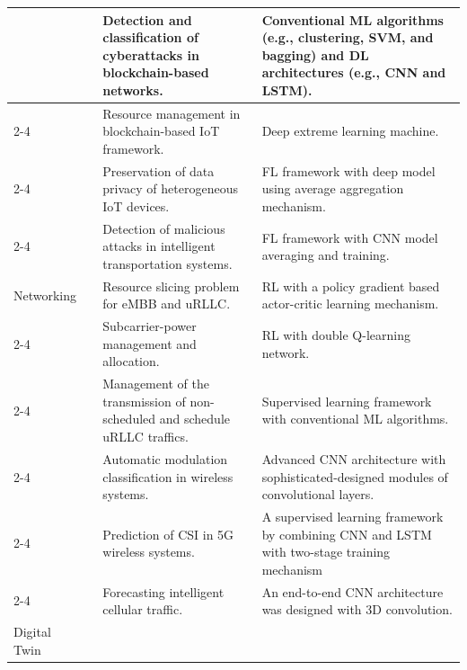 \documentclass[journal]{IEEEtran}
\begin{document}
\begin{table}[ht!]
\begin{tabular}{|p{2.10cm}|p{0.75cm}|p{5.75cm}|p{7.85cm}|}
& \cite{tanwar2019machine}	& Detection and classification of cyberattacks in blockchain-based networks.	& Conventional ML algorithms (e.g., clustering, SVM, and bagging) and DL architectures (e.g., CNN and LSTM). \\  \cline{2-4}
& \cite{khan2021amachine}	& Resource management in blockchain-based IoT framework.	& Deep extreme learning machine.\\  \cline{2-4}
& \cite{fan2021hybrid}	& Preservation of data privacy of heterogeneous IoT devices.	& FL framework with deep model using average aggregation mechanism. \\  \cline{2-4}
& \cite{liu2021blockchain}	& Detection of malicious attacks in intelligent transportation systems.	& FL framework with CNN model averaging and training.
 \\  \hline\hline
  
Networking 
& \cite{she2020deeplearning}	& Resource slicing problem for eMBB and uRLLC.	& RL with a policy gradient based actor-critic learning mechanism.\\  \cline{2-4}
& \cite{gu2021deepmultiagent}	& Subcarrier-power management and allocation.	& RL with double Q-learning network. \\  \cline{2-4}
& \cite{azari2019riskaware}	& Management of the transmission of non-scheduled and schedule uRLLC traffics.	& Supervised learning framework with conventional ML algorithms.\\  \cline{2-4}
& \cite{huynh2020mcnet}	& Automatic modulation classification in wireless systems.	& Advanced CNN architecture with sophisticated-designed modules of convolutional layers.\\  \cline{2-4}
& \cite{luo2020channel}	& Prediction of CSI in 5G wireless systems.	& A supervised learning framework by combining CNN and LSTM with two-stage training mechanism\\  \cline{2-4}
& \cite{guo2019deepspatial}	& Forecasting intelligent cellular traffic.	& An end-to-end CNN architecture was designed with 3D convolution.
 \\  \hline\hline
  
Digital Twin 


\end{tabular}
\end{table}
\end{document}
